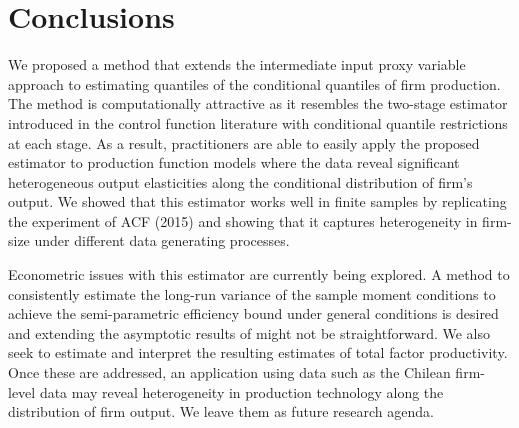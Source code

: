 \documentclass[11pt]{article}
\begin{document}
\section{Conclusions}

We proposed a method that extends the intermediate input proxy variable approach to estimating quantiles of the conditional quantiles of firm production. The method is computationally attractive as it resembles the two-stage estimator introduced in the control function literature with conditional quantile restrictions at each stage. As a result, practitioners are able to easily apply the proposed estimator to production function models where the data reveal significant heterogeneous output elasticities along the conditional distribution of firm's output. We showed that this estimator works well in finite samples by replicating the experiment of ACF (2015) and showing that it captures heterogeneity in firm-size under different data generating processes.  

Econometric issues with this estimator are currently being explored. A method to consistently estimate the long-run variance of the sample moment conditions to achieve the semi-parametric efficiency bound under general conditions is desired and extending the asymptotic results of \cite*{qgmm} might not be straightforward. We also seek to estimate and interpret the resulting estimates of total factor productivity. Once these are addressed, an application using data such as the Chilean firm-level data may reveal heterogeneity in production technology along the distribution of firm output. 
We leave them as future research agenda.


\pagebreak
\newpage











\end{document}

